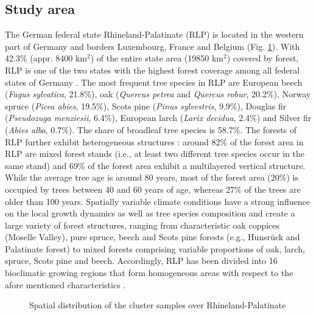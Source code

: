 \subsection{Study area}
\label{sec:regmod:studyarea}

The German federal state Rhineland-Palatinate (RLP) is located in the western part of Germany and borders Luxembourg, France and Belgium (Fig. \ref{fig:Study Area}). With 42.3\% (appr. 8400 km$^2$) of the entire state area (19850 km$^2$) covered by forest, RLP is one of the two states with the highest forest coverage among all federal states of Germany \citep{bwi3}.  The most frequent tree species in RLP are European beech (\textit{Fagus sylvatica}, 21.8\%), oak (\textit{Quercus petrea} and \textit{Quercus robur}, 20.2\%), Norway spruce (\textit{Picea abies}, 19.5\%), Scots pine (\textit{Pinus sylvestris}, 9.9\%), Douglas fir (\textit{Pseudozuga menziesii}, 6.4\%), European larch (\textit{Larix decidua}, 2.4\%) and Silver fir (\textit{Abies alba}, 0.7\%). The share of broadleaf tree species is 58.7\%. The forests of RLP further exhibit heterogeneous structures \citep{bwi3}: around 82\% of the forest area in RLP are mixed forest stands (i.e., at least two different tree species occur in the same stand) and 69\% of the forest area exhibit a multilayered vertical structure. While the average tree age is around 80 years, most of the forest area (20\%) is occupied by trees between 40 and 60 years of age, whereas 27\% of the trees are older than 100 years. Spatially variable climate conditions have a strong influence on the local growth dynamics as well as tree species composition and create a large variety of forest structures, ranging from characteristic oak coppices (Moselle Valley), pure spruce, beech and Scots pine forests (e.g., Hunsr{\"u}ck and Palatinate forest) to mixed forests comprising variable proportions of oak, larch, spruce, Scots pine and beech. Accordingly, RLP has been divided into 16 bioclimatic growing regions that form homogeneous areas with respect to the afore mentioned characteristics \citep{gauer2005}.

\begin{figure}[H]
	\centering
	\caption{Spatial distribution of the \bwi{} cluster samples over Rhineland-Palatinate}
	\label{fig:Study Area}
\end{figure}

